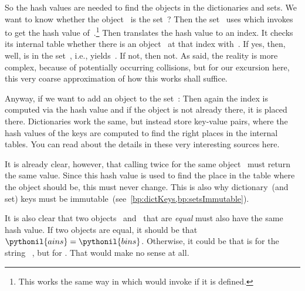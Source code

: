 So the hash values are needed to find the objects in the dictionaries and sets.
We want to know whether the object~ is  the set~?
Then the set~ uses  which invokes~ to get the hash value of~.\footnote{%
This works the same way in which  would invoke  if it is defined.}
Then  translates the hash value to an index.
It checks its internal table whether there is an object~ at that index with~.
If yes, then, well,  is in the set~, i.e.,  yields~.
If not, then not.
As said, the reality is more complex, because of potentially occurring collisions, but for our excursion here, this very coarse approximation of how this works shall suffice.

Anyway, if we want to add an object to the set~:
Then again the index is computed via the hash value and if the object is not already there, it is placed there.
Dictionaries work the same, but instead store key-value pairs, where the hash values of the keys are computed to find the right places in the internal tables.
You can read about the details in these very interesting sources here.

It is already clear, however, that calling  twice for the same object~ must return the same value.
Since this hash value is used to find the place in the table where the object should be, this must never change.
This is also why dictionary~(and set) keys must be immutable~(see~\cref{bp:dictKeys,bp:setsImmutable}).

It is also clear that two objects~ and~ that are \emph{equal} must also have the same hash value.
If two objects are equal, it should be that $\pythonil{a in s}=\pythonil{b in s}$.
Otherwise, it could be that  is  for the string ~, but  for .
That would make no sense at all.

